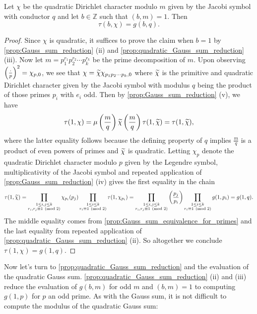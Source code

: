         \begin{theorem}
          Let $\chi$ be the quadratic Dirichlet character modulo $m$ given by the Jacobi symbol with conductor $q$ and let $b \in \mathbb{Z}$ such that $(b,m) = 1$. Then
          \[
            \tau(b,\chi) = g(b,q).
          \]
        \end{theorem}
        \begin{proof}
          Since $\chi$ is quadratic, it suffices to prove the claim when $b = 1$ by \cref{prop:Gauss_sum_reduction} (ii) and \cref{prop:quadratic_Gauss_sum_reduction} (iii). Now let $m = p_{1}^{r_{1}}p_{2}^{r_{2}} \cdots p_{k}^{r_{k}}$ be the prime decomposition of $m$. Upon observing $\textstyle{\left(\frac{\cdot}{p}\right)}^{2} = \chi_{p,0}$, we see that $\chi = \widetilde{\chi}\chi_{p_{1}p_{2} \cdots p_{k},0}$ where $\widetilde{\chi}$ is the primitive and quadratic Dirichlet character given by the Jacobi symbol with modulus $q$ being the product of those primes $p_{i}$ with $e_{i}$ odd. Then by \cref{prop:Gauss_sum_reduction} (v), we have
          \[
            \tau(1,\chi) = \mu\left(\frac{m}{q}\right)\widetilde{\chi}\left(\frac{m}{q}\right)\tau(1,\widetilde{\chi}) = \tau(1,\widetilde{\chi}),
          \]
          where the latter equality follows because the defining property of $q$ implies $\frac{m}{q}$ is a product of even powers of primes and $\widetilde{\chi}$ is quadratic. Letting $\chi_{p}$ denote the quadratic Dirichlet character modulo $p$ given by the Legendre symbol, multiplicativity of the Jacobi symbol and repeated application of \cref{prop:Gauss_sum_reduction} (iv) gives the first equality in the chain
          \[
            \tau(1,\widetilde{\chi}) = \prod_{\substack{1 \le i,j \le k \\ r_{i},r_{j} \equiv 1 \ \left(\text{mod }2\right)}}\chi_{p_{i}}(p_{j})\prod_{\substack{1 \le i \le k \\ r_{i} \equiv 1 \ \left(\text{mod }2\right)}}\tau(1,\chi_{p_{i}}) = \prod_{\substack{1 \le i,j \le k \\ r_{i},r_{j} \equiv 1 \ \left(\text{mod }2\right)}}\left(\frac{p_{j}}{p_{i}}\right)\prod_{\substack{1 \le i \le k \\ r_{i} \equiv 1 \ \left(\text{mod }2\right)}}g(1,p_{i}) = g(1,q).
          \]
          The middle equality comes from \cref{prop:Gauss_sum_equivalence_for_primes} and the last equality from repeated application of \cref{prop:quadratic_Gauss_sum_reduction} (ii). So altogether we conclude $\tau(1,\chi) = g(1,q)$.
        \end{proof}

        Now let's turn to \cref{prop:quadratic_Gauss_sum_reduction} and the evaluation of the quadratic Gauss sum. \cref{prop:quadratic_Gauss_sum_reduction} (ii) and (iii) reduce the evaluation of $g(b,m)$ for odd $m$ and $(b,m) = 1$ to computing $g(1,p)$ for $p$ an odd prime. As with the Gauss sum, it is not difficult to compute the modulus of the quadratic Gauss sum:

